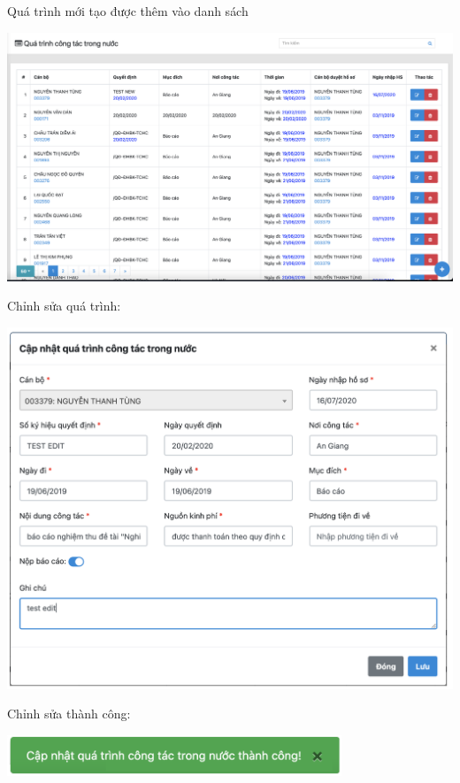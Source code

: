 \newpage
\noindent Quá trình mới tạo được thêm vào danh sách
\begin{center}
  \captionsetup{type=figure}
  \includegraphics[width=15cm]{img/test/viewNew.png}
\end{center}
Chỉnh sửa quá trình:
\begin{center}
  \captionsetup{type=figure}
  \includegraphics[width=15cm]{img/test/editForm.png}
\end{center}
\newpage
\noindent Chỉnh sửa thành công:
\begin{center}
  \captionsetup{type=figure}
  \includegraphics[width=10cm]{img/test/aleartEdit.png}
\end{center}
